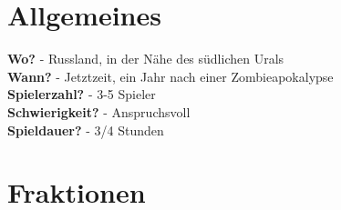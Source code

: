 
\section{Allgemeines}
\textbf{Wo?}            - Russland, in der Nähe des südlichen Urals \\
\textbf{Wann?}          - Jetztzeit, ein Jahr nach einer Zombieapokalypse \\
\textbf{Spielerzahl?}   - 3-5 Spieler \\
\textbf{Schwierigkeit?} - Anspruchsvoll \\
\textbf{Spieldauer?}    - 3/4 Stunden

\section{Fraktionen}
